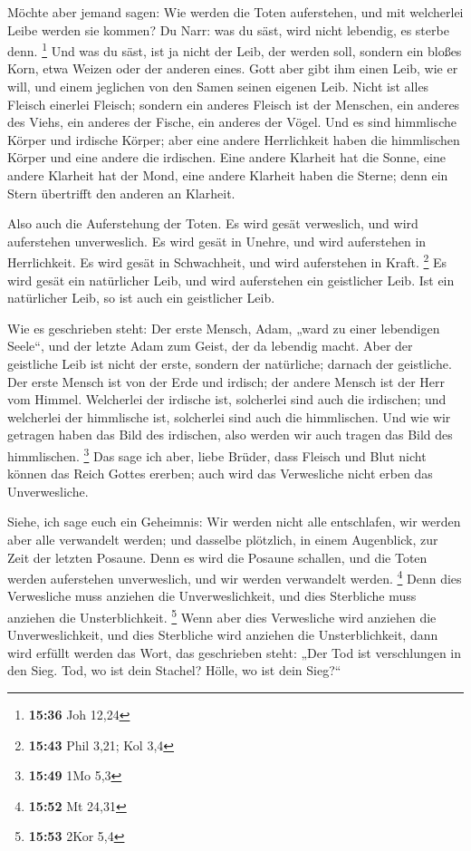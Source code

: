  Möchte aber jemand sagen: Wie werden die Toten
auferstehen, und mit welcherlei Leibe werden sie kommen? 
Du Narr: was du säst, wird nicht lebendig, es sterbe denn. \footnote{\textbf{15:36}
  Joh 12,24}  Und was du säst, ist ja nicht der Leib, der
werden soll, sondern ein bloßes Korn, etwa Weizen oder der anderen
eines.  Gott aber gibt ihm einen Leib, wie er will, und
einem jeglichen von den Samen seinen eigenen Leib.  Nicht
ist alles Fleisch einerlei Fleisch; sondern ein anderes Fleisch ist der
Menschen, ein anderes des Viehs, ein anderes der Fische, ein anderes der
Vögel.  Und es sind himmlische Körper und irdische
Körper; aber eine andere Herrlichkeit haben die himmlischen Körper und
eine andere die irdischen.  Eine andere Klarheit hat die
Sonne, eine andere Klarheit hat der Mond, eine andere Klarheit haben die
Sterne; denn ein Stern übertrifft den anderen an Klarheit.

 Also auch die Auferstehung der Toten. Es wird gesät
verweslich, und wird auferstehen unverweslich.  Es wird
gesät in Unehre, und wird auferstehen in Herrlichkeit. Es wird gesät in
Schwachheit, und wird auferstehen in Kraft. \footnote{\textbf{15:43}
  Phil 3,21; Kol 3,4}  Es wird gesät ein natürlicher
Leib, und wird auferstehen ein geistlicher Leib. Ist ein natürlicher
Leib, so ist auch ein geistlicher Leib.

 Wie es geschrieben steht: Der erste Mensch, Adam, „ward
zu einer lebendigen Seele``, und der letzte Adam zum Geist, der da
lebendig macht.  Aber der geistliche Leib ist nicht der
erste, sondern der natürliche; darnach der geistliche. 
Der erste Mensch ist von der Erde und irdisch; der andere Mensch ist der
Herr vom Himmel.  Welcherlei der irdische ist, solcherlei
sind auch die irdischen; und welcherlei der himmlische ist, solcherlei
sind auch die himmlischen.  Und wie wir getragen haben
das Bild des irdischen, also werden wir auch tragen das Bild des
himmlischen. \footnote{\textbf{15:49} 1Mo 5,3}  Das sage
ich aber, liebe Brüder, dass Fleisch und Blut nicht können das Reich
Gottes ererben; auch wird das Verwesliche nicht erben das Unverwesliche.

 Siehe, ich sage euch ein Geheimnis: Wir werden nicht
alle entschlafen, wir werden aber alle verwandelt werden;
 und dasselbe plötzlich, in einem Augenblick, zur Zeit
der letzten Posaune. Denn es wird die Posaune schallen, und die Toten
werden auferstehen unverweslich, und wir werden verwandelt werden.
\footnote{\textbf{15:52} Mt 24,31}  Denn dies Verwesliche
muss anziehen die Unverweslichkeit, und dies Sterbliche muss anziehen
die Unsterblichkeit. \footnote{\textbf{15:53} 2Kor 5,4} 
Wenn aber dies Verwesliche wird anziehen die Unverweslichkeit, und dies
Sterbliche wird anziehen die Unsterblichkeit, dann wird erfüllt werden
das Wort, das geschrieben steht:  „Der Tod ist
verschlungen in den Sieg. Tod, wo ist dein Stachel? Hölle, wo ist dein
Sieg?{}``

